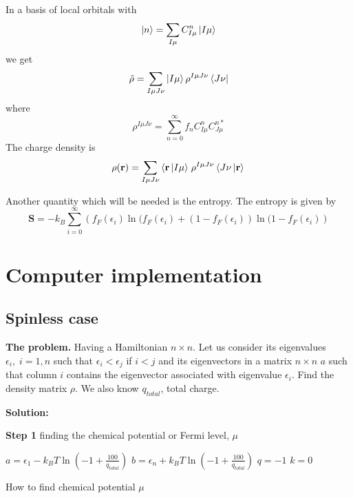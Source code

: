 \par{In a basis of local orbitals with}
\begin{equation}
\mathinner{|{n}\rangle}=\sum_{I\mu}C_{I\mu}^{n}\mathinner{|{I\mu}\rangle}
\end{equation}
we get
\begin{equation}
\hat{\rho}=\sum_{I\mu J\nu}\mathinner{|{I\mu}\rangle}\rho^{I\mu J\nu}\mathinner{\langle{J \nu}|}
\end{equation}
where
\begin{equation}
\rho^{I\mu J\nu}=\sum_{n=0}^{\infty}f_nC_{I\mu}^{n}C_{J\mu}^{n*}
\end{equation}
The charge density is
\begin{equation}
\rho({\bf r})=\sum_{I\mu J\nu}\left\langle {\bf r} \left\vert I\mu \right\rangle\right.\rho^{I\mu J\nu}\left\langle J \nu \left\vert {\bf r} \right\rangle\right.
\end{equation}
\par{Another quantity which will be needed is the entropy. The entropy is given by}
\begin{equation}
\bm{S}=-k_B\sum_{i=0}^{\infty}\left(f_F(\epsilon_i)\ln(f_F(\epsilon_i)+(1-f_F(\epsilon_i))\ln(1-f_F(\epsilon_i)\right)
\end{equation}

\section{Computer implementation}
\subsection{Spinless case}
\label{spinless}
\par{{\bf The problem.} Having a Hamiltonian $n \times n$. Let us consider its eigenvalues
$\epsilon_i, \; i=1,n$ such that $\epsilon_i < \epsilon_j$ if $i<j$ and its eigenvectors
in a matrix $n \times n$ $a$ such that column $i$ contains the eigenvector associated
with eigenvalue $\epsilon_i$. Find the density matrix $\rho$. We also know $q_{total}$, total charge.
}
\par{{\bf Solution:}}
\par{{\bf Step 1} finding the chemical potential or Fermi level, $\mu$}

\begin{algorithm}[H]
\label{fermilevel}
%
%
$a=\epsilon_1-k_BT\ln(-1+\frac{100}{q_{total}})$\;%
$b=\epsilon_n+k_BT\ln(-1+\frac{100}{q_{total}})$\;%
$q=-1$\;%
$k=0$\;%
%
%
\caption{How to find chemical potential $\mu$}%
\end{algorithm}

